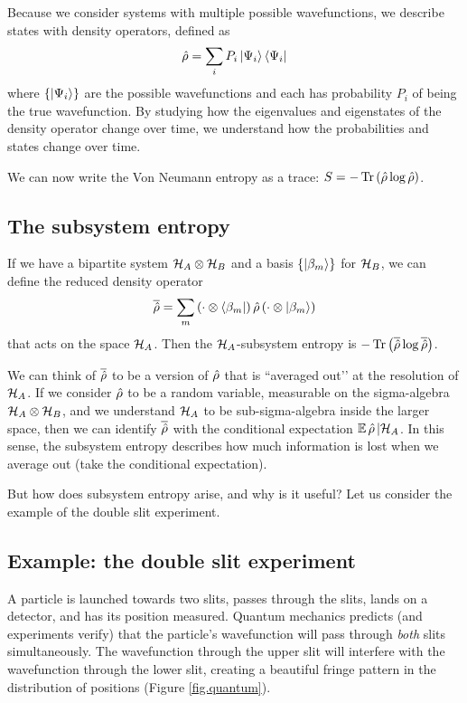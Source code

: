 Because we consider systems with multiple possible wavefunctions, we describe states with density operators, defined as
\[
\hat{\rho} = \sum_i P_i \left|\Psi_i\right\rangle\left\langle\Psi_i\right|
\]
where \(\{\left|\Psi_i\right\rangle\}\) are the possible wavefunctions and each has probability \(P_i\) of being the true wavefunction. By studying how the eigenvalues and eigenstates of the density operator change over time, we understand how the probabilities and states change over time.

We can now write the Von Neumann entropy as a trace: \(S = -\operatorname{Tr}\left(\hat{\rho} \log \hat{\rho}\right)\).

\subsection{The subsystem entropy}

If we have a bipartite system \(\mathcal{H}_A \otimes \mathcal{H}_B\) and a basis \(\{\left|\beta_m\right\rangle\}\) for \(\mathcal{H}_B\), we can define the reduced density operator
\[
\overline{\hat{\rho}} = \sum_m \left(\cdot \otimes \left\langle\beta_m\right|\right) \hat{\rho} \left(\cdot \otimes \left|\beta_m\right\rangle\right)
\]
that acts on the space \(\mathcal{H}_A\). Then the \(\mathcal{H}_A\)-subsystem entropy is \(-\operatorname{Tr}\left(\overline{\hat{\rho}}\log \overline{\hat{\rho}}\right)\).

We can think of \(\overline{\hat{\rho}}\) to be a version of \(\hat{\rho}\) that is ``averaged out’’ at the resolution of \(\mathcal{H}_A\). If we consider \(\hat{\rho}\) to be a random variable, measurable on the sigma-algebra \(\mathcal{H}_A \otimes \mathcal{H}_B\), and we understand \(\mathcal{H}_A\) to be sub-sigma-algebra inside the larger space, then we can identify \(\overline{\hat{\rho}}\) with the conditional expectation \(\mathbb{E}\, \hat{\rho} \,| \mathcal{H}_A\). In this sense, the subsystem entropy describes how much information is lost when we average out (take the conditional expectation).

But how does subsystem entropy arise, and why is it useful? Let us consider the example of the double slit experiment.

\subsection{Example: the double slit experiment}\label{sec.doubleslit}

A particle is launched towards two slits, passes through the slits, lands on a detector, and has its position measured. Quantum mechanics predicts (and experiments verify) that the particle’s wavefunction will pass through \emph{both} slits simultaneously. The wavefunction through the upper slit will interfere with the wavefunction through the lower slit, creating a beautiful fringe pattern in the distribution of positions (Figure \ref{fig.quantum}).


